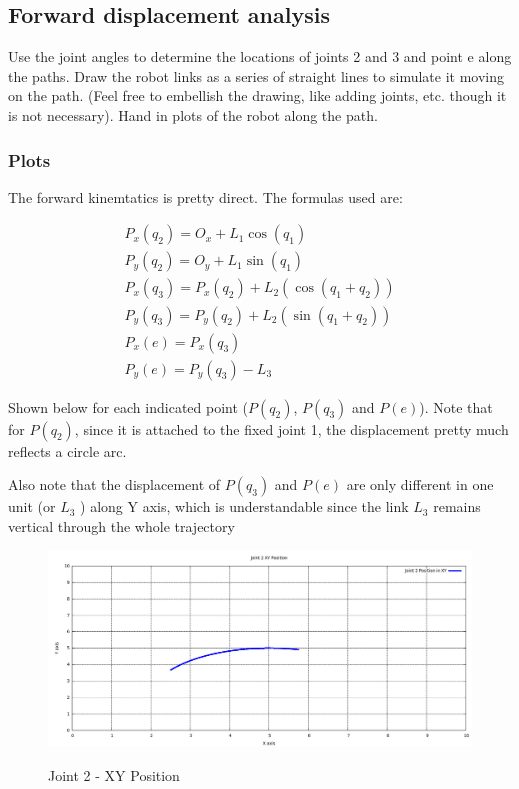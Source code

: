 \documentclass[10pt,a4paper]{article}
\begin{document}
\subsection{ Forward displacement analysis} 
Use the joint angles to determine the locations of joints 2 and 3 and point e along the paths. Draw the robot links as a series of straight lines to simulate it moving on the path. (Feel free to embellish the drawing, like adding joints, etc. though it is not necessary). Hand in plots of the
robot along the path.

\subsubsection*{Plots}
The forward kinemtatics is pretty direct. The formulas used are:

\[ \begin{matrix}
P_{x}(q_{2}) = O_{x} + L_{1} \cos(q_{1}) \\
P_{y}(q_{2}) = O_{y} + L_{1} \sin(q_{1}) \\
P_{x}(q_{3}) = P_{x}(q_{2}) + L_{2} ( \cos(q_{1} + q_{2}) ) \\
P_{y}(q_{3}) = P_{y}(q_{2}) + L_{2} ( \sin(q_{1} + q_{2}) ) \\
P_{x}(e) = P_{x}(q_{3}) \\
P_{y}(e) = P_{y}(q_{3}) - L_{3}
\end{matrix} \]

Shown below for each indicated point ($P(q_{2})$, $P(q_{3})$ and $P(e)$). Note that for $P(q_{2})$, since it is attached to the fixed joint 1, the displacement pretty much reflects a circle arc.

Also note that the displacement of $P(q_{3})$ and $P(e)$ are only different in one unit (or $L_{3}$ ) along Y axis, which is understandable since the link $L_{3}$ remains vertical through the whole trajectory

	\begin{figure}[H]
	\includegraphics[angle = 0, scale = 0.3]{figures/Q1Joint2Pos.png} 
	\label{fig:Q1Joint2Pos}
	\caption{ Joint 2 - XY Position}
	\end{figure}
\end{document}
